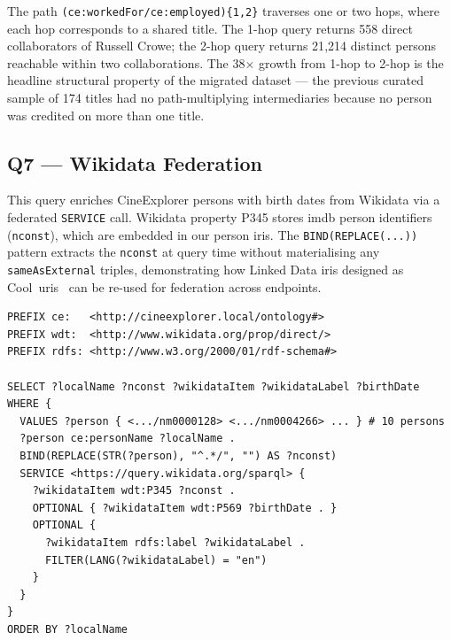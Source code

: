 The path \texttt{(ce:workedFor/ce:employed)\{1,2\}} traverses one or two hops, where each hop corresponds to a shared title. The 1-hop query returns 558 direct collaborators of Russell Crowe; the 2-hop query returns 21{,}214 distinct persons reachable within two collaborations. The 38$\times$ growth from 1-hop to 2-hop is the headline structural property of the migrated dataset --- the previous curated sample of 174 titles had no path-multiplying intermediaries because no person was credited on more than one title.

\subsection{Q7 — Wikidata Federation}

This query enriches CineExplorer persons with birth dates from Wikidata via a federated \texttt{SERVICE} call. Wikidata property P345 stores \ac{imdb} person identifiers (\texttt{nconst}), which are embedded in our person \acp{iri}. The \texttt{BIND(REPLACE(...))} pattern extracts the \texttt{nconst} at query time without materialising any \texttt{sameAsExternal} triples, demonstrating how Linked Data \acp{iri} designed as Cool~\acp{uri}~\cite{cooluris} can be re-used for federation across endpoints.

\begin{lstlisting}[language=SPARQL]
PREFIX ce:   <http://cineexplorer.local/ontology#>
PREFIX wdt:  <http://www.wikidata.org/prop/direct/>
PREFIX rdfs: <http://www.w3.org/2000/01/rdf-schema#>

SELECT ?localName ?nconst ?wikidataItem ?wikidataLabel ?birthDate
WHERE {
  VALUES ?person { <.../nm0000128> <.../nm0004266> ... } # 10 persons
  ?person ce:personName ?localName .
  BIND(REPLACE(STR(?person), "^.*/", "") AS ?nconst)
  SERVICE <https://query.wikidata.org/sparql> {
    ?wikidataItem wdt:P345 ?nconst .
    OPTIONAL { ?wikidataItem wdt:P569 ?birthDate . }
    OPTIONAL {
      ?wikidataItem rdfs:label ?wikidataLabel .
      FILTER(LANG(?wikidataLabel) = "en")
    }
  }
}
ORDER BY ?localName
\end{lstlisting}

